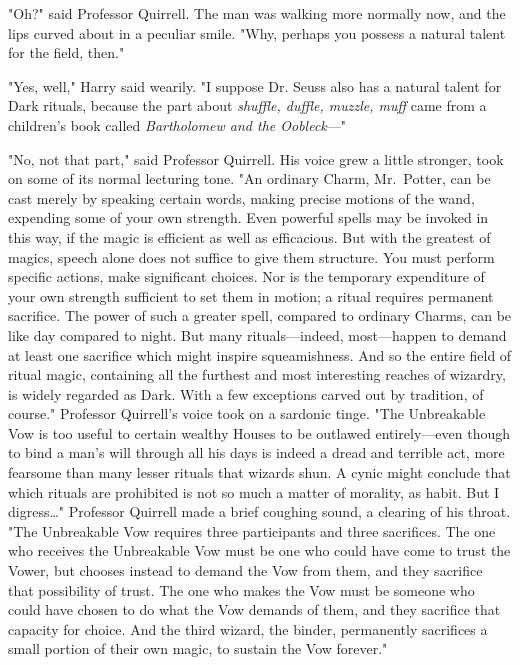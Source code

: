 "Oh?" said Professor Quirrell. The man was walking more normally now, and the
lips curved about in a peculiar smile. "Why, perhaps you possess a natural
talent for the field, then."

"Yes, well," Harry said wearily. "I suppose Dr. Seuss also has a natural talent
for Dark rituals, because the part about \emph{shuffle, duffle, muzzle, muff}
came from a children's book called \emph{Bartholomew and the Oobleck}---"

"No, not that part," said Professor Quirrell. His voice grew a little stronger,
took on some of its normal lecturing tone. "An ordinary Charm, Mr.~Potter, can
be cast merely by speaking certain words, making precise motions of the wand,
expending some of your own strength. Even powerful spells may be invoked in
this way, if the magic is efficient as well as efficacious. But with the
greatest of magics, speech alone does not suffice to give them structure. You
must perform specific actions, make significant choices. Nor is the temporary
expenditure of your own strength sufficient to set them in motion; a ritual
requires permanent sacrifice. The power of such a greater spell, compared to
ordinary Charms, can be like day compared to night. But many rituals---indeed,
most---happen to demand at least one sacrifice which might inspire
squeamishness. And so the entire field of ritual magic, containing all the
furthest and most interesting reaches of wizardry, is widely regarded as Dark.
With a few exceptions carved out by tradition, of course." Professor Quirrell's
voice took on a sardonic tinge. "The Unbreakable Vow is too useful to certain
wealthy Houses to be outlawed entirely---even though to bind a man's will
through all his days is indeed a dread and terrible act, more fearsome than
many lesser rituals that wizards shun. A cynic might conclude that which
rituals are prohibited is not so much a matter of morality, as habit. But I
digress{\ldots}" Professor Quirrell made a brief coughing sound, a clearing of
his throat. "The Unbreakable Vow requires three participants and three
sacrifices. The one who receives the Unbreakable Vow must be one who could have
come to trust the Vower, but chooses instead to demand the Vow from them, and
they sacrifice that possibility of trust. The one who makes the Vow must be
someone who could have chosen to do what the Vow demands of them, and they
sacrifice that capacity for choice. And the third wizard, the binder,
permanently sacrifices a small portion of their own magic, to sustain the Vow
forever."

